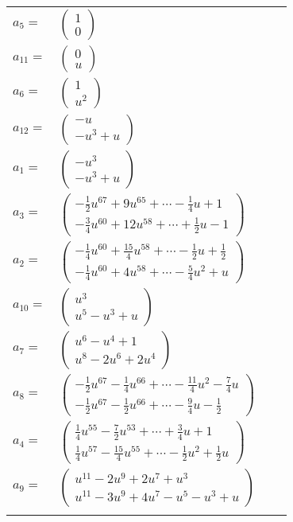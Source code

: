 \documentclass[1p]{elsarticle_modified}
\theoremstyle{definition}
\begin{document}
\begin{tabular}{m{7pt} m{180pt} m{7pt} m{180pt} }
\flushright $a_{5}=$&$\begin{pmatrix}1\\0\end{pmatrix}$ \\
\flushright $a_{11}=$&$\begin{pmatrix}0\\u\end{pmatrix}$ \\
\flushright $a_{6}=$&$\begin{pmatrix}1\\u^2\end{pmatrix}$ \\
\flushright $a_{12}=$&$\begin{pmatrix}- u\\- u^3+u\end{pmatrix}$ \\
\flushright $a_{1}=$&$\begin{pmatrix}- u^3\\- u^3+u\end{pmatrix}$ \\
\flushright $a_{3}=$&$\begin{pmatrix}-\frac{1}{2} u^{67}+9 u^{65}+\cdots-\frac{1}{4} u+1\\-\frac{3}{4} u^{60}+12 u^{58}+\cdots+\frac{1}{2} u-1\end{pmatrix}$ \\
\flushright $a_{2}=$&$\begin{pmatrix}-\frac{1}{4} u^{60}+\frac{15}{4} u^{58}+\cdots-\frac{1}{2} u+\frac{1}{2}\\-\frac{1}{4} u^{60}+4 u^{58}+\cdots-\frac{5}{4} u^2+u\end{pmatrix}$ \\
\flushright $a_{10}=$&$\begin{pmatrix}u^3\\u^5- u^3+u\end{pmatrix}$ \\
\flushright $a_{7}=$&$\begin{pmatrix}u^6- u^4+1\\u^8-2 u^6+2 u^4\end{pmatrix}$ \\
\flushright $a_{8}=$&$\begin{pmatrix}-\frac{1}{2} u^{67}-\frac{1}{4} u^{66}+\cdots-\frac{11}{4} u^2-\frac{7}{4} u\\-\frac{1}{2} u^{67}-\frac{1}{2} u^{66}+\cdots-\frac{9}{4} u-\frac{1}{2}\end{pmatrix}$ \\
\flushright $a_{4}=$&$\begin{pmatrix}\frac{1}{4} u^{55}-\frac{7}{2} u^{53}+\cdots+\frac{3}{4} u+1\\\frac{1}{4} u^{57}-\frac{15}{4} u^{55}+\cdots-\frac{1}{2} u^2+\frac{1}{2} u\end{pmatrix}$ \\
\flushright $a_{9}=$&$\begin{pmatrix}u^{11}-2 u^9+2 u^7+u^3\\u^{11}-3 u^9+4 u^7- u^5- u^3+u\end{pmatrix}$\\&\end{tabular}
\end{document}
